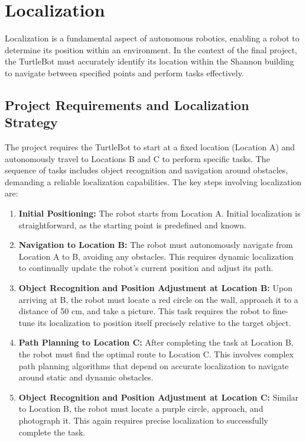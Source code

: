 \documentclass{article}
\begin{document}
	\section{Localization}
	Localization is a fundamental aspect of autonomous robotics, enabling a robot to determine its position within an environment. In the context of the final project, the TurtleBot must accurately identify its location within the Shannon building to navigate between specified points and perform tasks effectively.
	
	\subsection{Project Requirements and Localization Strategy}
	The project requires the TurtleBot to start at a fixed location (Location A) and autonomously travel to Locations B and C to perform specific tasks. The sequence of tasks includes object recognition and navigation around obstacles, demanding a reliable localization capabilities. The key steps involving localization are:
	
	\begin{enumerate}
		\item \textbf{Initial Positioning:} The robot starts from Location A. Initial localization is straightforward, as the starting point is predefined and known.
		\item \textbf{Navigation to Location B:} The robot must autonomously navigate from Location A to B, avoiding any obstacles. This requires dynamic localization to continually update the robot's current position and adjust its path.
		\item \textbf{Object Recognition and Position Adjustment at Location B:} Upon arriving at B, the robot must locate a red circle on the wall, approach it to a distance of 50 cm, and take a picture. This task requires the robot to fine-tune its localization to position itself precisely relative to the target object.
		\item \textbf{Path Planning to Location C:} After completing the task at Location B, the robot must find the optimal route to Location C. This involves complex path planning algorithms that depend on accurate localization to navigate around static and dynamic obstacles.
		\item \textbf{Object Recognition and Position Adjustment at Location C:} Similar to Location B, the robot must locate a purple circle, approach, and photograph it. This again requires precise localization to successfully complete the task.
	\end{enumerate}
	
\end{document}
